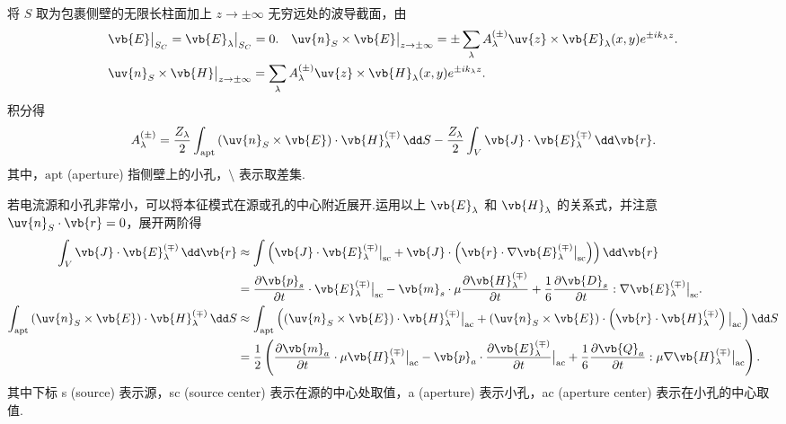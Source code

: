 将 \(S\) 取为包裹侧壁的无限长柱面加上 \(z \to \pm\infty\) 无穷远处的波导截面，由
\begin{align*}
	&\vb{E} \big|_{S_C} = \vb{E}_{\lambda} \big|_{S_C} = 0. \quad \uv{n}_S \times \vb{E} \big|_{z \to \pm\infty} = \pm \sum_{\lambda} A_{\lambda}^{(\pm)} \uv{z} \times \vb{E}_{\lambda}(x, y) e^{\pm i k_{\lambda} z}.\\
	&\uv{n}_S \times \vb{H} \big|_{z \to \pm\infty} = \sum_{\lambda} A_{\lambda}^{(\pm)} \uv{z} \times \vb{H}_{\lambda}(x, y) e^{\pm i k_{\lambda} z}.
\end{align*}
积分得
\begin{align*}
	A_{\lambda}^{(\pm)} = \dfrac{Z_{\lambda}}{2} \int_{\text{apt}} \left( \uv{n}_S \times \vb{E} \right) \cdot \vb{H}_{\lambda}^{(\mp)} \, \dd S - \dfrac{Z_{\lambda}}{2} \int_V \vb{J} \cdot \vb{E}_{\lambda}^{(\mp)} \, \dd \vb{r}.
\end{align*}
其中，\(\text{apt}\) (aperture) 指侧壁上的小孔，\(\setminus\) 表示取差集.

若电流源和小孔非常小，可以将本征模式在源或孔的中心附近展开.运用以上 \(\vb{E}_{\lambda}\) 和 \(\vb{H}_{\lambda}\) 的关系式，并注意 \(\uv{n}_S \cdot \vb{r} = 0\)，展开两阶得
\begin{align*}
	\int_V \vb{J} \cdot \vb{E}_{\lambda}^{(\mp)} \, \dd \vb{r} &\approx \int \left( \vb{J} \cdot \vb{E}_{\lambda}^{(\mp)} \big|_{\text{sc}} + \vb{J} \cdot \left( \vb{r} \cdot \nabla \vb{E}_{\lambda}^{(\mp)} \big|_{\text{sc}} \right) \right) \dd \vb{r} \\&= \dfrac{\partial \vb{p}_s}{\partial t} \cdot \vb{E}_{\lambda}^{(\mp)} \big|_{\text{sc}} - \vb{m}_s \cdot \mu \dfrac{\partial \vb{H}_{\lambda}^{(\mp)}}{\partial t} + \dfrac{1}{6} \dfrac{\partial \vb{D}_s}{\partial t} : \nabla \vb{E}_{\lambda}^{(\mp)} \big|_{\text{sc}}.\\
	\int_{\text{apt}} \left( \uv{n}_S \times \vb{E} \right) \cdot \vb{H}_{\lambda}^{(\mp)} \, \dd S &\approx \int_{\text{apt}} \left( \left( \uv{n}_S \times \vb{E} \right) \cdot \vb{H}_{\lambda}^{(\mp)} \big|_{\text{ac}} + \left( \uv{n}_S \times \vb{E} \right) \cdot \left( \vb{r} \cdot \vb{H}_{\lambda}^{(\mp)} \right) \big|_{\text{ac}} \right) \dd S \\&= \dfrac{1}{2} \left( \dfrac{\partial \vb{m}_a}{\partial t} \cdot \mu \vb{H}_{\lambda}^{(\mp)} \big|_{\text{ac}} - \vb{p}_a \cdot \dfrac{\partial \vb{E}_{\lambda}^{(\mp)}}{\partial t} \big|_{\text{ac}} + \dfrac{1}{6} \dfrac{\partial \vb{Q}_a}{\partial t} : \mu \nabla \vb{H}_{\lambda}^{(\mp)} \big|_{\text{ac}} \right).
\end{align*}
其中下标 s (source) 表示源，sc (source center) 表示在源的中心处取值，a (aperture) 表示小孔，ac (aperture center) 表示在小孔的中心取值.


